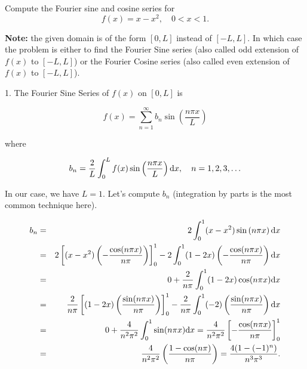 \documentclass[11pt]{article}
\begin{document}
\begin{problem}
Compute the Fourier sine and cosine series for 
\begin{equation*}
f(x) = x-x^2, \quad 0<x<1.
\end{equation*}
\end{problem}

\begin{solution}
\textbf{Note:} the given domain is of the form $[0, L]$ instead of $[-L, L]$. In which case the problem is either to find the Fourier Sine series (also called odd extension of $f(x)$ to $[-L, L]$) or the Fourier Cosine series (also called even extension of $f(x)$ to $[-L, L]$).

1. The Fourier Sine Series of $f(x)$ on $[0,L]$ is

\begin{equation*}
f(x) = \sum_{n=1}^{\infty} b_{n} \sin \left(\dfrac{n\pi x}{L}\right)
\end{equation*}

where 

\begin{equation*}
b_{n} = \dfrac{2}{L} \int_{0}^{L} f(x) \sin \left( \dfrac{n \pi x}{L} \right) {\rm d} x, \quad n=1,2,3,\ldots
\end{equation*}

In our case, we have $L=1$. Let's compute $b_{n}$ (integration by parts is the most common technique here).

\begin{eqnarray*}
b_{n} & = & 2 \int_{0}^{1} (x-x^2) \sin \left( n \pi x\right) {\rm d} x \\
 & = & 2 \left[(x-x^2)\left(- \dfrac{\cos(n \pi x)}{n \pi} \right) \right]_{0}^{1} -2  \int_{0}^{1} (1-2x) \left(- \dfrac{\cos(n \pi x)}{n \pi} \right) {\rm d} x \\
  & = &0 + \dfrac{2}{n \pi}  \int_{0}^{1} (1-2x)  \cos(n \pi x) {\rm d} x \\
& = & \dfrac{2}{n \pi} \left[  (1-2x)\left( \dfrac{\sin(n \pi x)}{n \pi} \right) \right]_{0}^{1} - \dfrac{2}{n \pi} \int_{0}^{1} (-2)  \left( \dfrac{\sin(n \pi x)}{n \pi} \right) {\rm d} x \\
& = & 0  + \dfrac{4}{n^2 \pi^2} \int_{0}^{1}   \sin(n \pi x) {\rm d} x  = \dfrac{4}{n^2 \pi^2} \left[- \dfrac{\cos(n \pi x)}{n \pi} \right]_{0}^{1} \\
& = &\dfrac{4}{n^2 \pi^2} \left( \dfrac{1-\cos(n \pi)}{n \pi} \right) = \dfrac{4(1-(-1)^n)}{n^3 \pi^3}.
\end{eqnarray*}


\end{solution}
\end{document}
